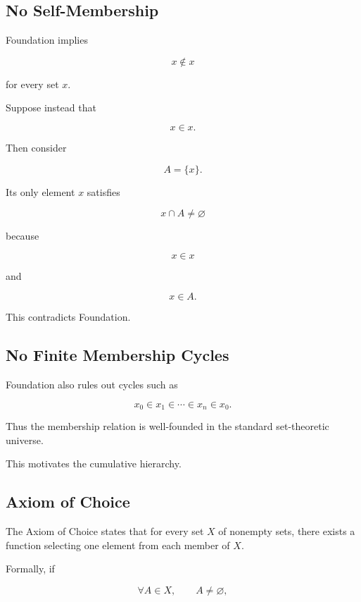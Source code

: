 \subsection{No Self-Membership}
\label{subsec:no-self-membership}

Foundation implies

\[
\boxed{
x\notin x
}
\]

for every set \(x\).

Suppose instead that

\[
x\in x.
\]

Then consider

\[
A=\{x\}.
\]

Its only element \(x\) satisfies

\[
x\cap A\neq\varnothing
\]

because

\[
x\in x
\]

and

\[
x\in A.
\]

This contradicts Foundation.

\subsection{No Finite Membership Cycles}
\label{subsec:no-membership-cycles}

Foundation also rules out cycles such as

\[
x_0\in x_1\in\cdots\in x_n\in x_0.
\]

Thus the membership relation is well-founded in the standard set-theoretic
universe.

This motivates the cumulative hierarchy.

\subsection{Axiom of Choice}
\label{subsec:axiom-choice}

The Axiom of Choice states that for every set \(X\) of nonempty sets, there
exists a function selecting one element from each member of \(X\).

Formally, if

\[
\forall A\in X,
\qquad
A\neq\varnothing,
\]

